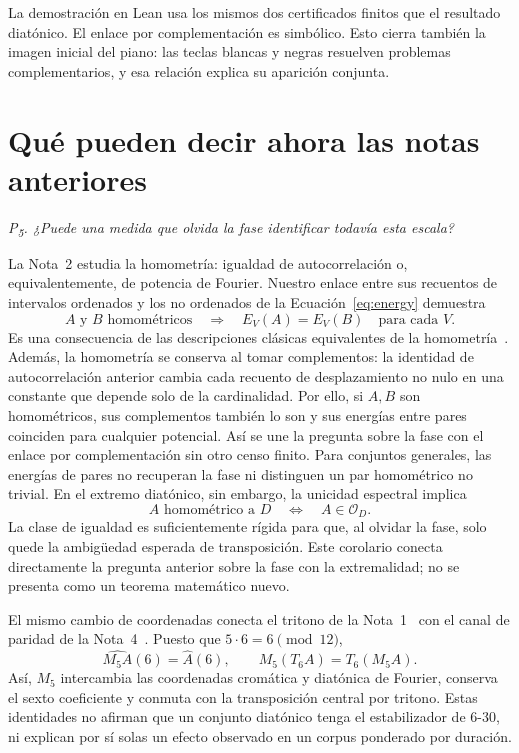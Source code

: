\documentclass[11pt]{article}
\newcommand{\Ahat}{\widehat A}
\newcommand{\question}[1]{\smallskip\noindent\textit{#1}\smallskip}
\newcommand{\orb}{\mathcal O_D}
\begin{document}
La demostración en Lean usa los mismos dos certificados finitos que el resultado
diatónico. El enlace por complementación es simbólico. Esto cierra también la imagen
inicial del piano: las teclas blancas y negras resuelven problemas complementarios,
y esa relación explica su aparición conjunta.

\section{Qué pueden decir ahora las notas anteriores}\label{sec:earlier}

\question{P\textsubscript{5}. ¿Puede una medida que olvida la fase identificar todavía esta escala?}

La Nota~2 estudia la homometría: igualdad de autocorrelación o, equivalentemente, de
potencia de Fourier. Nuestro enlace entre sus recuentos de intervalos ordenados y los
no ordenados de la Ecuación~\eqref{eq:energy} demuestra
\[
 A\text{ y }B\text{ homométricos}\quad\Longrightarrow\quad E_V(A)=E_V(B)
 \quad\text{para cada }V.
\]
Es una consecuencia de las descripciones clásicas equivalentes de la homometría~\cite{AS}.
Además, la homometría se conserva al tomar complementos: la identidad de autocorrelación
anterior cambia cada recuento de desplazamiento no nulo en una constante que depende solo
de la cardinalidad. Por ello, si $A,B$ son homométricos, sus complementos también lo son
y sus energías entre pares coinciden para cualquier potencial. Así se une la pregunta
sobre la fase con el enlace por complementación sin otro censo finito.
Para conjuntos generales, las energías de pares no recuperan la fase ni distinguen un
par homométrico no trivial. En el extremo diatónico, sin embargo, la unicidad espectral implica
\[
 A\text{ homométrico a }D\quad\Longleftrightarrow\quad A\in\orb.
\]
La clase de igualdad es suficientemente rígida para que, al olvidar la fase, solo quede
la ambigüedad esperada de transposición. Este corolario conecta directamente la pregunta
anterior sobre la fase con la extremalidad; no se presenta como un teorema matemático nuevo.

El mismo cambio de coordenadas conecta el tritono de la Nota~1~\cite{Tritone} con el
canal de paridad de la Nota~4~\cite{Voice}. Puesto que $5\cdot6=6\pmod{12}$,
\[
 \widehat{M_5A}(6)=\Ahat(6),\qquad M_5(T_6A)=T_6(M_5A).
\]
Así, $M_5$ intercambia las coordenadas cromática y diatónica de Fourier, conserva el
sexto coeficiente y conmuta con la transposición central por tritono. Estas identidades
no afirman que un conjunto diatónico tenga el estabilizador de 6-30, ni explican por
sí solas un efecto observado en un corpus ponderado por duración.
\end{document}

